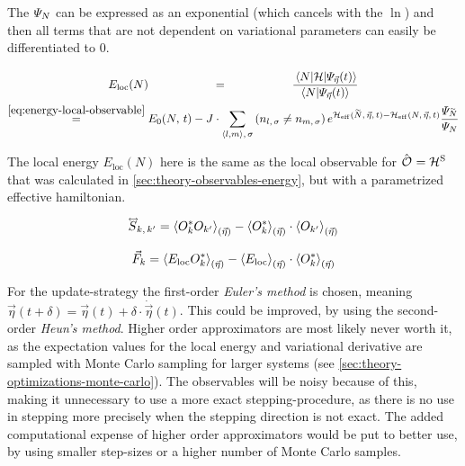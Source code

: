 The $\psiN$ can be expressed as an exponential (which cancels with the $\ln$) and then all terms that are not dependent on variational parameters can easily be differentiated to 0.

\begin{equation}
    \label{eq:local-energy-definition}
    \begin{gathered}
        E_\text{loc}(N) \stackrel{\phantom{\ref{eq:energy-local-observable}}}{=} \frac{
            \bracketHelper{N}{\hamiltonian}{\psiEta{\vec{\eta}}{t}}
        }{
            \braketHelper{N}{\psiEta{\vec{\eta}}{t}}
        } 
        \\
        \stackrel{\ref{eq:energy-local-observable}}{=}
        E_0(N,\,t)-
        J \cdot \neighborsumWSpin{l}{m}{\sigma}
        \left(n_{l,\,\sigma} \neq n_{m,\,\sigma}\right)
            e^{\HeffOft[\vphantom{N}\smash{\tilde{N}},\,\vec{\eta}]-\HeffOft[N,\,\vec{\eta}]}
        \frac{
            \psiN[\vphantom{N}\smash{\tilde{N}}]
        }{
            \psiN[N]
        }
    \end{gathered}
\end{equation}

The local energy $E_\text{loc}(N)$ here is the same as the local observable  for $\ObservableOp = \pictureHamiltonian[\schroedingerPicture]$ that was calculated in \autoref{sec:theory-observables-energy}, but with a parametrized effective hamiltonian.

\begin{equation}
    \label{eq:covariance-matrix}
    \matvec{S}_{k,\, k'} = \timelessEtaExpectationVal{O_{k}^\ast O_{k'}} - \timelessEtaExpectationVal{O_{k}^\ast} \cdot \timelessEtaExpectationVal{O_{k'} \vphantom{O_{k}^\ast}}
\end{equation}

\begin{equation}
    \label{eq:tdvp-force}
    \vec{F}_k = \timelessEtaExpectationVal{E_\text{loc} O_{k}^\ast} - \timelessEtaExpectationVal{E_\text{loc}  \vphantom{O_{k}^\ast}} \cdot \timelessEtaExpectationVal{O_{k}^\ast}
\end{equation}


For the update-strategy the first-order \emph{Euler's method} is chosen, meaning $\vec{\eta}(t + \delta) = \vec{\eta}(t) + \delta \cdot \dot{\vec{\eta}}(t)$.
This could be improved, by using the second-order \emph{Heun's method}. 
Higher order approximators are most likely never worth it, as the expectation values for the local energy and variational derivative are sampled with Monte Carlo sampling for larger systems (see \autoref{sec:theory-optimizations-monte-carlo}).
The observables will be noisy because of this, making it unnecessary to use a more exact stepping-procedure, as there is no use in stepping more precisely when the stepping direction is not exact.
The added computational expense of higher order approximators would be put to better use, by using smaller step-sizes or a higher number of Monte Carlo samples.

